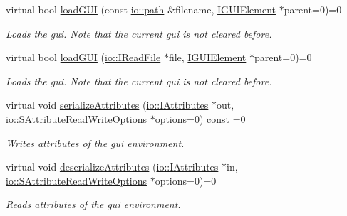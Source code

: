 \begin{DoxyCompactItemize}
virtual bool \hyperlink{classirr_1_1gui_1_1IGUIEnvironment_a6e847a40e5c97c846f2d654605ae13a0}{load\+G\+UI} (const \hyperlink{namespaceirr_1_1io_ab1bdc45edb3f94d8319c02bc0f840ee1}{io\+::path} \&filename, \hyperlink{classirr_1_1gui_1_1IGUIElement}{I\+G\+U\+I\+Element} $\ast$parent=0)=0
\begin{DoxyCompactList}\small\item\em Loads the gui. Note that the current gui is not cleared before. \end{DoxyCompactList}\item 
virtual bool \hyperlink{classirr_1_1gui_1_1IGUIEnvironment_a23e53c388d45358c53304d095f0b029b}{load\+G\+UI} (\hyperlink{classirr_1_1io_1_1IReadFile}{io\+::\+I\+Read\+File} $\ast$file, \hyperlink{classirr_1_1gui_1_1IGUIElement}{I\+G\+U\+I\+Element} $\ast$parent=0)=0
\begin{DoxyCompactList}\small\item\em Loads the gui. Note that the current gui is not cleared before. \end{DoxyCompactList}\item 
\mbox{\label{classirr_1_1gui_1_1IGUIEnvironment_a6342ec41dcd9fbd3f587dce369d11b34}} 
virtual void \hyperlink{classirr_1_1gui_1_1IGUIEnvironment_a6342ec41dcd9fbd3f587dce369d11b34}{serialize\+Attributes} (\hyperlink{classirr_1_1io_1_1IAttributes}{io\+::\+I\+Attributes} $\ast$out, \hyperlink{structirr_1_1io_1_1SAttributeReadWriteOptions}{io\+::\+S\+Attribute\+Read\+Write\+Options} $\ast$options=0) const =0
\begin{DoxyCompactList}\small\item\em Writes attributes of the gui environment. \end{DoxyCompactList}\item 
\mbox{\label{classirr_1_1gui_1_1IGUIEnvironment_a8890a0b0cb5a08c9cca65c6efa3a1e0e}} 
virtual void \hyperlink{classirr_1_1gui_1_1IGUIEnvironment_a8890a0b0cb5a08c9cca65c6efa3a1e0e}{deserialize\+Attributes} (\hyperlink{classirr_1_1io_1_1IAttributes}{io\+::\+I\+Attributes} $\ast$in, \hyperlink{structirr_1_1io_1_1SAttributeReadWriteOptions}{io\+::\+S\+Attribute\+Read\+Write\+Options} $\ast$options=0)=0
\begin{DoxyCompactList}\small\item\em Reads attributes of the gui environment. \end{DoxyCompactList}\item 

\end{DoxyCompactItemize}
